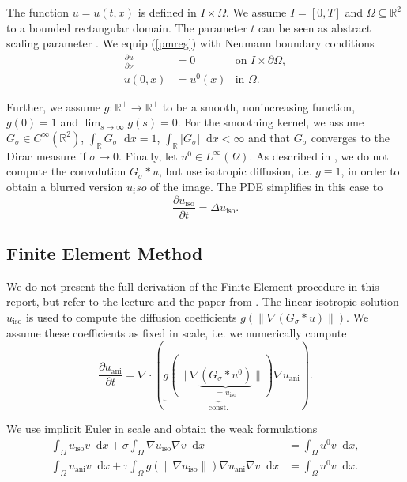 \documentclass{report}
\renewcommand*\d{\mathop{}\!\mathrm{d}}
\def\ssq{\subseteq}
\def\R{\mathbb{R}}
\def\iso{\text{iso}}
\def\ani{\text{ani}}
\begin{document}
The function $u = u(t,x)$ is defined in $I \times \Omega$. We assume $I = [0, T]$ and $\Omega \ssq \R^2$ to a bounded rectangular domain. The parameter $t$ can be seen as abstract scaling parameter \citep[p. 219]{handlovicova2002}. We equip (\ref{pmreg}) with Neumann boundary conditions
\begin{align}
	\frac{\partial u}{\partial \nu} &= 0 & \text{on } I \times \partial \Omega, \\
	u(0,x) &= {u^0}(x) & \text{in } \Omega.
\end{align}

Further, we assume $g: \R^+ \rightarrow \R^+$ to be a smooth, nonincreasing function, $g(0)=1$ and $\lim_{s \rightarrow \infty} g(s) = 0$. For the smoothing kernel, we assume $G_\sigma \in C^\infty(\R^2)$, $\int_\R G_\sigma \d x = 1$, $\int_\R |G_\sigma| \d x < \infty$ and that $G_\sigma$ converges to the Dirac measure if $\sigma \to 0$. Finally, let $u^0 \in L^\infty(\Omega)$. As described in \cite{handlovicova2002}, we do not compute the convolution $G_{\sigma} \ast u$, but use isotropic diffusion, i.e. $g \equiv 1$, in order to obtain a blurred version $u_iso$ of the image. The PDE simplifies in this case to
\begin{equation} \label{pmiso}
	\frac{\partial u_\iso}{\partial t} = \Delta u_\iso.
\end{equation}

\subsection{Finite Element Method} 

We do not present the full derivation of the Finite Element procedure in this report, but refer to the lecture and the paper from \cite{handlovicova2002}. The linear isotropic solution $u_\iso$ is used to compute the diffusion coefficients $g\left(\left\|\nabla (G_{\sigma} \ast u)\right\|\right)$. We assume these coefficients as fixed in scale, i.e. we numerically compute
\begin{equation}
	\frac{\partial u_\ani}{\partial t} = \nabla \cdot (\underbrace{g(\|\nabla \underbrace{(G_{\sigma} \ast u^0)}_{=u_\iso}\|)}_\text{const.} \nabla u_\ani).
\end{equation}

We use implicit Euler in scale and obtain the weak formulations
\begin{align}
	\int_\Omega u_\iso v \d x + \sigma \int_\Omega \nabla u_\iso \nabla v \d x &= \int_\Omega u^0 v \d x, \\
	\int_\Omega u_\ani v \d x + \tau \int_\Omega g(\|\nabla u_\iso\|) \nabla u_\ani \nabla v \d x &= \int_\Omega u^0 v \d x.
\end{align}
\end{document}
